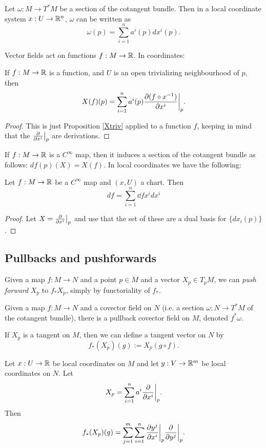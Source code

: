 \documentclass[11pt, english]{article}
\begin{document}
\begin{prop}
Let $\omega:M \to T^\ast M$ be a section of the cotangent bundle. Then in a local coordinate system $x:U \to \mathbb{R}^n$, $\omega$ can be written as
\[
\omega(p) = \sum_{i=1}^n a^i(p) dx^i(p).
\]
\end{prop}

Vector fields act on functions $f:M \to \mathbb{R}$. In coordinates:
\begin{prop}
\label{Xftriv}
If $f:M \to \mathbb{R}$ is a function, and $U$ is an open trivializing neighbourhood of $p$, then
\[
X(f)(p) = \sum_{i=1}^n a^i(p)\restr{\dd{(f \circ x^{-1})}{x^i}}{p}.
\]
\end{prop}
\begin{proof}
This is just Proposition \ref{Xtriv} applied to a function $f$, keeping in mind that the $\restr{\dd{}{x^i}}{p}$ are derivations.
\end{proof}

If $f:M \to \mathbb{R}$ is a $C^\infty$ map, then it induces a section of the cotangent bundle as follows: $df(p)(X)=X(f)$. In local coordinates we have the following:
\begin{prop}
\label{df}
Let $f:M \to \mathbb{R}$ be a $C^\infty$ map and $(x,U)$ a chart. Then
\[
df = \sum_{i=1}^n \dd{f}{x^i} dx^i
\]
\end{prop}
\begin{proof}
Let $X = \restr{\dd{}{x^i}}{p}$ and use that the set of these are a dual basis for $\{ dx_i(p) \}$.
\end{proof}

\subsection{Pullbacks and pushforwards}

Given a map $f:M \to N$ and a point $p \in M$ and a vector $X_p \in T_pM$, we can \emph{push forward} $X_p$ to $f_\ast X_p$, simply by functoriality of $f_\ast$. 

Given a map $f:M \to N$ and a covector field on $N$ (i.e. a section $\omega:N \to T^\ast M$ of the cotangent bundle), there is a pullback covector field on $M$, denoted $f^\ast \omega$.

\begin{defi}
If $X_p$ is a tangent on $M$, then we can define a tangent vector on $N$ by 
\[
f_\ast (X_p)(g) := X_p(g \circ f).
\]
\end{defi}

\begin{defi}
Let $x:U \to \mathbb{R}$ be local coordinates on $M$ and let $y:V \to \mathbb{R}^m$ be local coordinates on $N$. Let
\[
X_p = \sum_{i=1}^n a^i \restr{\dd{}{x^i}}{p}.
\]
Then
\[
f_\ast(X_p)(g) = \sum_{j=1}^m \sum_{i=1}^n \restr{\dd{y^j}{x^i}}{p} \restr{\dd{}{y^j}}{p}.
\]
\end{defi}
\end{document}
